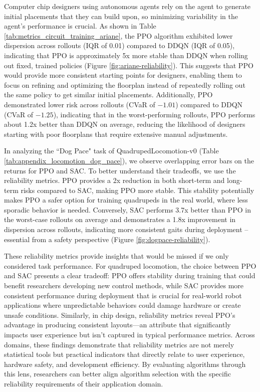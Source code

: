 Computer chip designers using autonomous agents rely on the agent to generate initial placements that they can build upon, so minimizing variability in the agent's performance is crucial.
As shown in Table \ref{tab:metrics_circuit_training_ariane}, the PPO algorithm exhibited lower dispersion across rollouts (IQR of \num{0.01}) compared to DDQN (IQR of \num{0.05}), indicating that PPO is approximately 5x more stable than DDQN when rolling out fixed, trained policies (Figure \ref{fig:ariane-reliability}).
This suggests that PPO would provide more consistent starting points for designers, enabling them to focus on refining and optimizing the floorplan instead of repeatedly rolling out the same policy to get similar initial placements.
Additionally, PPO demonstrated lower risk across rollouts (CVaR of $-1.01$) compared to DDQN (CVaR of $-1.25$), indicating that in the worst-performing rollouts, PPO performs about 1.2x better than DDQN on average, reducing the likelihood of designers starting with poor floorplans that require extensive manual adjustments.

In analyzing the ``Dog Pace" task of QuadrupedLocomotion-v0 (Table \ref{tab:appendix_locomotion_dog_pace}), we observe overlapping error bars on the returns for PPO and SAC.
To better understand their tradeoffs, we use the reliability metrics.
PPO provides a 2x reduction in both short-term and long-term risks compared to SAC, making PPO more stable.
This stability potentially makes PPO a safer option for training quadrupeds in the real world, where less sporadic behavior is needed.
Conversely, SAC performs 3.7x better than PPO in the worst-case rollouts on average and demonstrates a 1.8x improvement in dispersion across rollouts, indicating more consistent gaits during deployment -- essential from a safety perspective (Figure \ref{fig:dogpace-reliability}).

These reliability metrics provide insights that would be missed if we only considered task performance. For quadruped locomotion, the choice between PPO and SAC presents a clear tradeoff: PPO offers stability during training that could benefit researchers developing new control methods, while SAC provides more consistent performance during deployment that is crucial for real-world robot applications where unpredictable behaviors could damage hardware or create unsafe conditions. Similarly, in chip design, reliability metrics reveal PPO's advantage in producing consistent layouts—an attribute that significantly impacts user experience but isn't captured in typical performance metrics. Across domains, these findings demonstrate that reliability metrics are not merely statistical tools but practical indicators that directly relate to user experience, hardware safety, and development efficiency.
By evaluating algorithms through this lens, researchers can better align algorithm selection with the specific reliability requirements of their application domain.


